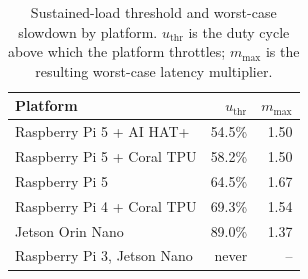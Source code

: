 
\begin{table}[t]
  \centering
  \caption{Sustained-load threshold and worst-case slowdown by platform.
    $u_\mathrm{thr}$ is the duty cycle above which the platform throttles;
    $m_\mathrm{max}$ is the resulting worst-case latency multiplier.}
  \label{tab:platform-thermal}
  \small
  \begin{tabular}{lrr}
    \toprule
    Platform & $u_\mathrm{thr}$ & $m_\mathrm{max}$ \\
    \midrule
    Raspberry Pi 5 + AI HAT+ & 54.5\% & 1.50 \\
    Raspberry Pi 5 + Coral TPU & 58.2\% & 1.50 \\
    Raspberry Pi 5 & 64.5\% & 1.67 \\
    Raspberry Pi 4 + Coral TPU & 69.3\% & 1.54 \\
    Jetson Orin Nano & 89.0\% & 1.37 \\
    Raspberry Pi 3, Jetson Nano & never & -- \\
    \bottomrule
  \end{tabular}
\end{table}
